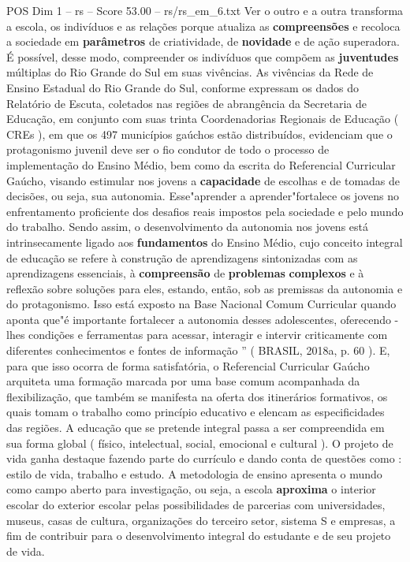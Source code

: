 \begin{textsample}{POS Dim 1 – rs – Score 53.00 – rs/rs\_em\_6.txt}
Ver o outro e a outra transforma a escola, os indivíduos e as relações porque atualiza as \textbf{compreensões} e recoloca a sociedade em \textbf{parâmetros} de criatividade, de \textbf{novidade} e de ação superadora.
É possível, desse modo, compreender os indivíduos que compõem as \textbf{juventudes} múltiplas do Rio Grande do Sul em suas vivências.
As vivências da Rede de Ensino Estadual do Rio Grande do Sul, conforme expressam os dados do Relatório de Escuta, coletados nas regiões de abrangência da Secretaria de Educação, em conjunto com suas trinta Coordenadorias Regionais de Educação ( CREs ), em que os 497 municípios gaúchos estão distribuídos, evidenciam que o protagonismo juvenil deve ser o fio condutor de todo o processo de implementação do Ensino Médio, bem como da escrita do Referencial Curricular Gaúcho, visando estimular nos jovens a \textbf{capacidade} de escolhas e de tomadas de decisões, ou seja, sua autonomia.
Esse"aprender a aprender"fortalece os jovens no enfrentamento proficiente dos desafios reais impostos pela sociedade e pelo mundo do trabalho.
Sendo assim, o desenvolvimento da autonomia nos jovens está intrinsecamente ligado aos \textbf{fundamentos} do Ensino Médio, cujo conceito integral de educação se refere à construção de aprendizagens sintonizadas com as aprendizagens essenciais, à \textbf{compreensão} de \textbf{problemas} \textbf{complexos} e à reflexão sobre soluções para eles, estando, então, sob as premissas da autonomia e do protagonismo.
Isso está exposto na Base Nacional Comum Curricular quando aponta que"é importante fortalecer a autonomia desses adolescentes, oferecendo -lhes condições e ferramentas para acessar, interagir e intervir criticamente com diferentes conhecimentos e fontes de informação ” ( BRASIL, 2018a, p. 60 ).
E, para que isso ocorra de forma satisfatória, o Referencial Curricular Gaúcho arquiteta uma formação marcada por uma base comum acompanhada da flexibilização, que também se manifesta na oferta dos itinerários formativos, os quais tomam o trabalho como princípio educativo e elencam as especificidades das regiões.
A educação que se pretende integral passa a ser compreendida em sua forma global ( físico, intelectual, social, emocional e cultural ).
O projeto de vida ganha destaque fazendo parte do currículo e dando conta de questões como : estilo de vida, trabalho e estudo.
A metodologia de ensino apresenta o mundo como campo aberto para investigação, ou seja, a escola \textbf{aproxima} o interior escolar do exterior escolar pelas possibilidades de parcerias com universidades, museus, casas de cultura, organizações do terceiro setor, sistema S e empresas, a fim de contribuir para o desenvolvimento integral do estudante e de seu projeto de vida.

\end{textsample}
